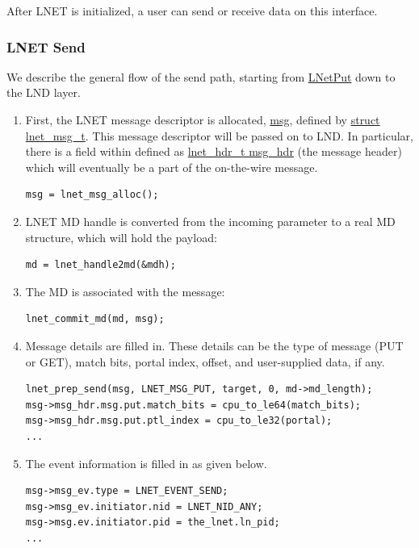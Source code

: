 After LNET is initialized, a user can send or receive data on this interface.

\subsubsection{LNET Send}

We describe the general flow of the send path, starting from \url{LNetPut}
down to the LND layer.

\begin{enumerate}

\item First, the LNET message descriptor is allocated, \url{msg}, defined by
\url{struct lnet_msg_t}. This message descriptor will be passed on to LND. In
particular, there is a field within defined as \url{lnet_hdr_t msg_hdr} (the
message header) which will eventually be a part of the on-the-wire message.

\begin{Verbatim}
msg = lnet_msg_alloc();
\end{Verbatim}

\item LNET MD handle is converted from the incoming parameter to a real MD
structure, which will hold the payload:

\begin{Verbatim}
md = lnet_handle2md(&mdh);
\end{Verbatim}

\item The MD is associated with the message:

\begin{Verbatim}
lnet_commit_md(md, msg);
\end{Verbatim}

\item Message details are filled in. These details can be the type of message (PUT or GET),
match bits, portal index, offset, and user-supplied data, if any.

\begin{Verbatim}
lnet_prep_send(msg, LNET_MSG_PUT, target, 0, md->md_length);
msg->msg_hdr.msg.put.match_bits = cpu_to_le64(match_bits);
msg->msg_hdr.msg.put.ptl_index = cpu_to_le32(portal);
...
\end{Verbatim}

\item The event information is filled in as given below.

\begin{Verbatim}
msg->msg_ev.type = LNET_EVENT_SEND;
msg->msg_ev.initiator.nid = LNET_NID_ANY;
msg->msg.ev.initiator.pid = the_lnet.ln_pid;
...
\end{Verbatim}


\end{enumerate}
